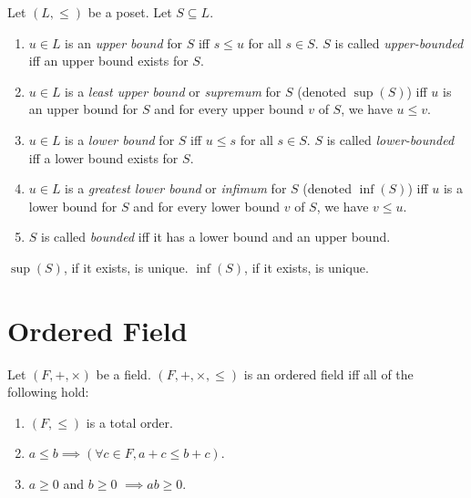 \documentclass[a4paper, 12pt, fleqn]{article}
\begin{document}
\begin{definition}
Let $(L, \le)$ be a poset. Let $S \subseteq L$.
\begin{enumerate}
\item $u \in L$ is an \emph{upper bound} for $S$ iff $s \le u$ for all $s \in S$.
    $S$ is called \emph{upper-bounded} iff an upper bound exists for $S$.
\item $u \in L$ is a \emph{least upper bound} or \emph{supremum} for $S$ (denoted $\sup(S)$)
    iff $u$ is an upper bound for $S$ and for every upper bound $v$ of $S$, we have $u \le v$.
\item $u \in L$ is a \emph{lower bound} for $S$ iff $u \le s$ for all $s \in S$.
    $S$ is called \emph{lower-bounded} iff a lower bound exists for $S$.
\item $u \in L$ is a \emph{greatest lower bound} or \emph{infimum} for $S$ (denoted $\inf(S)$)
    iff $u$ is a lower bound for $S$ and for every lower bound $v$ of $S$, we have $v \le u$.
\item $S$ is called \emph{bounded} iff it has a lower bound and an upper bound.
\end{enumerate}
\end{definition}

\begin{lemma}
$\sup(S)$, if it exists, is unique.
$\inf(S)$, if it exists, is unique.
\end{lemma}

\section{Ordered Field}

\begin{definition}
\label{defn:ord-field}
Let $(F, +, \times)$ be a field.
$(F, +, \times, \le)$ is an ordered field iff all of the following hold:
\begin{enumerate}
\item $(F, \le)$ is a total order.
\item $a \le b \implies (\forall c \in F, a + c \le b + c)$.
\item $a \ge 0$ and $b \ge 0$ $\implies ab \ge 0$.
\end{enumerate}
\end{definition}
\end{document}

